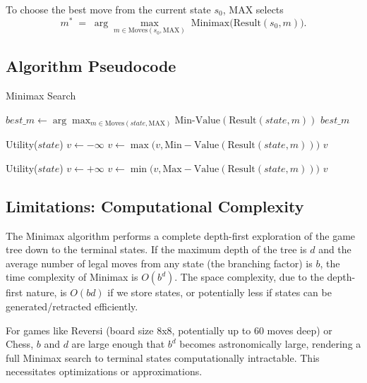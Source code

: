 \documentclass[11pt]{article}
\begin{document}
To choose the best move from the current state $s_0$, MAX selects
\[
  m^* \;=\;\arg\max_{m\in\mathrm{Moves}(s_0,\mathrm{MAX})}\;
  \mathrm{Minimax}\bigl(\mathrm{Result}(s_0,m)\bigr).
\]

\subsection{Algorithm Pseudocode}
\begin{algorithm}
\caption{Minimax Search}\label{alg:minimax}
\begin{algorithmic}[1]
  \State $best\_m \gets
    \displaystyle\arg\max_{m\in\mathrm{Moves}(state,\mathrm{MAX})}
      \mathrm{Min\text{-}Value}(\mathrm{Result}(state,m))$
  \State \Return $best\_m$
\EndFunction

      \Return Utility($state$)
    \EndIf
    \State $v\gets -\infty$
      \State $v\gets\max\bigl(v,\mathrm{Min-Value}(\mathrm{Result}(state,m))\bigr)$
    \EndFor
    \Return $v$
\EndFunction

      \Return Utility($state$)
    \EndIf
    \State $v\gets +\infty$
      \State $v\gets\min\bigl(v,\mathrm{Max-Value}(\mathrm{Result}(state,m))\bigr)$
    \EndFor
    \Return $v$
\EndFunction
\end{algorithmic}
\end{algorithm}

\subsection{Limitations: Computational Complexity}

The Minimax algorithm performs a complete depth-first exploration of the game tree down to the terminal states. If the maximum depth of the tree is $d$ and the average number of legal moves from any state (the branching factor) is $b$, the time complexity of Minimax is $O(b^d)$. The space complexity, due to the depth-first nature, is $O(bd)$ if we store states, or potentially less if states can be generated/retracted efficiently.

For games like Reversi (board size 8x8, potentially up to 60 moves deep) or Chess, $b$ and $d$ are large enough that $b^d$ becomes astronomically large, rendering a full Minimax search to terminal states computationally intractable. This necessitates optimizations or approximations.
\end{document}
